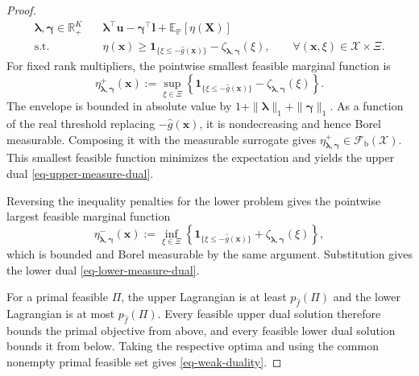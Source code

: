 \documentclass[review,11pt,3p,authoryear,nopreprintline]{elsarticle}
\begin{document}
\begin{proof}
\begin{equation*}
\begin{aligned}
{{      \bm\lambda,\bm\gamma\in\mathbb R_+^K}}
      \quad &\bm\lambda^\top\bm u-\bm\gamma^\top\bm l+\mathbb E_{\mathbb P}\left[\eta(\bm X)\right]\\
      \text{s.t.}\quad & \eta(\bm x)\ge
      \mathbf1_{\{\xi\le-\hat g(\bm x)\}}
      -\zeta_{\bm\lambda,\bm\gamma}(\xi),
      \qquad\forall(\bm x,\xi)\in\mathcal X\times\Xi.
    \end{aligned}
  \end{equation*}
  For fixed rank multipliers, the pointwise smallest feasible marginal function is
  \begin{equation*}
    \eta^+_{\bm\lambda,\bm\gamma}(\bm x)
    :=\sup_{\xi\in\Xi}\left\{
      \mathbf1_{\{\xi\le-\hat g(\bm x)\}}
      -\zeta_{\bm\lambda,\bm\gamma}(\xi)
    \right\}.
  \end{equation*}
  The envelope is bounded in absolute value by $1+\|\bm\lambda\|_1+\|\bm\gamma\|_1$. As a function of the real threshold replacing $-\hat g(\bm x)$, it is nondecreasing and hence Borel measurable. Composing it with the measurable surrogate gives $\eta^+_{\bm\lambda,\bm\gamma}\in\mathcal F_{\mathrm b}(\mathcal X)$. This smallest feasible function minimizes the expectation and yields the upper dual \eqref{eq-upper-measure-dual}.

  Reversing the inequality penalties for the lower problem gives the pointwise largest feasible marginal function
  \begin{equation*}
    \eta^-_{\bm\lambda,\bm\gamma}(\bm x)
    :=\inf_{\xi\in\Xi}\left\{
      \mathbf1_{\{\xi\le-\hat g(\bm x)\}}
      +\zeta_{\bm\lambda,\bm\gamma}(\xi)
    \right\},
  \end{equation*}
  which is bounded and Borel measurable by the same argument. Substitution gives the lower dual \eqref{eq-lower-measure-dual}.

  For a primal feasible $\Pi$, the upper Lagrangian is at least $p_{\hat f}(\Pi)$ and the lower Lagrangian is at most $p_{\hat f}(\Pi)$. Every feasible upper dual solution therefore bounds the primal objective from above, and every feasible lower dual solution bounds it from below. Taking the respective optima and using the common nonempty primal feasible set gives \eqref{eq-weak-duality}.
\end{proof}
\end{document}
